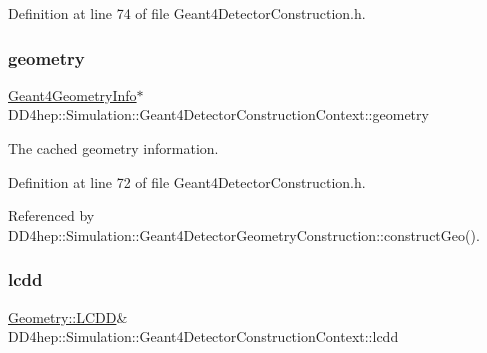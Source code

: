Definition at line 74 of file Geant4\+Detector\+Construction.\+h.

\hypertarget{class_d_d4hep_1_1_simulation_1_1_geant4_detector_construction_context_a6da3039365bc44c54314ff0d51cfc655}{}\label{class_d_d4hep_1_1_simulation_1_1_geant4_detector_construction_context_a6da3039365bc44c54314ff0d51cfc655} 
\subsubsection{\texorpdfstring{geometry}{geometry}}
{\footnotesize\ttfamily \hyperlink{class_d_d4hep_1_1_simulation_1_1_geant4_geometry_info}{Geant4\+Geometry\+Info}$\ast$ D\+D4hep\+::\+Simulation\+::\+Geant4\+Detector\+Construction\+Context\+::geometry}



The cached geometry information. 



Definition at line 72 of file Geant4\+Detector\+Construction.\+h.



Referenced by D\+D4hep\+::\+Simulation\+::\+Geant4\+Detector\+Geometry\+Construction\+::construct\+Geo().

\hypertarget{class_d_d4hep_1_1_simulation_1_1_geant4_detector_construction_context_a39ab0e51872f7ce4974d7f1784af251e}{}\label{class_d_d4hep_1_1_simulation_1_1_geant4_detector_construction_context_a39ab0e51872f7ce4974d7f1784af251e} 
\subsubsection{\texorpdfstring{lcdd}{lcdd}}
{\footnotesize\ttfamily \hyperlink{class_d_d4hep_1_1_geometry_1_1_l_c_d_d}{Geometry\+::\+L\+C\+DD}\& D\+D4hep\+::\+Simulation\+::\+Geant4\+Detector\+Construction\+Context\+::lcdd}



